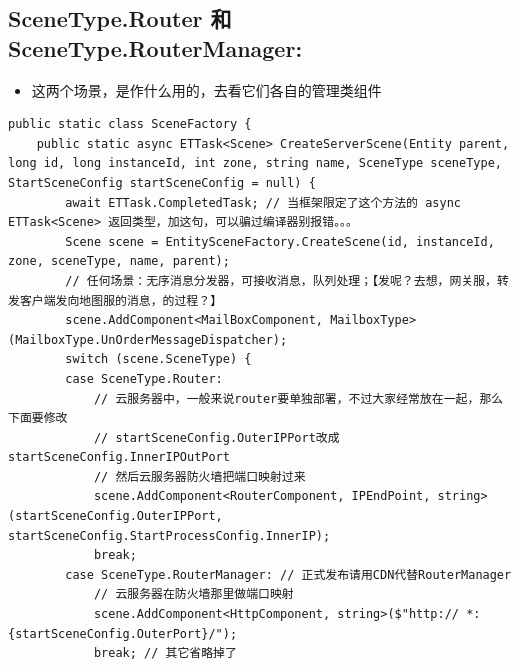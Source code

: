 \documentclass[9pt, b5paper]{article}
\begin{document}
\subsection{SceneType.Router 和 SceneType.RouterManager:}
\label{sec:orgdde1588}
\begin{itemize}
\item 这两个场景，是作什么用的，去看它们各自的管理类组件
\end{itemize}
\begin{verbatim}
public static class SceneFactory {
    public static async ETTask<Scene> CreateServerScene(Entity parent, long id, long instanceId, int zone, string name, SceneType sceneType, StartSceneConfig startSceneConfig = null) {
        await ETTask.CompletedTask; // 当框架限定了这个方法的 async ETTask<Scene> 返回类型，加这句，可以骗过编译器别报错。。。
        Scene scene = EntitySceneFactory.CreateScene(id, instanceId, zone, sceneType, name, parent);
        // 任何场景：无序消息分发器，可接收消息，队列处理；【发呢？去想，网关服，转发客户端发向地图服的消息，的过程？】
        scene.AddComponent<MailBoxComponent, MailboxType>(MailboxType.UnOrderMessageDispatcher); 
        switch (scene.SceneType) {
        case SceneType.Router:
            // 云服务器中，一般来说router要单独部署，不过大家经常放在一起，那么下面要修改
            // startSceneConfig.OuterIPPort改成startSceneConfig.InnerIPOutPort
            // 然后云服务器防火墙把端口映射过来
            scene.AddComponent<RouterComponent, IPEndPoint, string>(startSceneConfig.OuterIPPort, startSceneConfig.StartProcessConfig.InnerIP);
            break;
        case SceneType.RouterManager: // 正式发布请用CDN代替RouterManager
            // 云服务器在防火墙那里做端口映射
            scene.AddComponent<HttpComponent, string>($"http:// *:{startSceneConfig.OuterPort}/");
            break; // 其它省略掉了
\end{verbatim}
\end{document}
